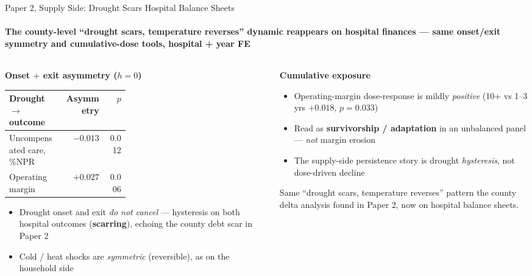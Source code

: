 \documentclass[aspectratio=169,11pt]{beamer}
\newcommand{\emphcolor}[1]{{\color{WarmOrange}\textbf{#1}}}
\newcommand{\tealtext}[1]{{\color{Teal}#1}}
\newcommand{\graytext}[1]{{\color{WarmGray}#1}}
\begin{document}
\begin{frame}{Paper 2, Supply Side: Drought Scars Hospital Balance Sheets}
  \framesubtitle{The county-level ``drought scars, temperature reverses'' dynamic reappears on hospital finances --- same onset/exit symmetry and cumulative-dose tools, hospital + year FE}
  \begin{columns}[T]
    \begin{column}{0.50\textwidth}
      \footnotesize
      \textbf{\tealtext{Onset \(+\) exit asymmetry (\(h=0\))}}
      \vspace{0.2em}
      \scriptsize
      \begin{tabular}{@{}>{\raggedright\arraybackslash}p{0.46\linewidth}rr@{}}
        \toprule
        Drought \(\to\) outcome & Asymmetry & \(p\) \\
        \midrule
        \rowcolor{Teal!10}
        Uncompensated care, \%NPR & \emphcolor{\(-0.013\)} & 0.012 \\
        Operating margin          & \emphcolor{\(+0.027\)} & 0.006 \\
        \bottomrule
      \end{tabular}
      \vspace{0.35em}
      \begin{itemize}\itemsep0.12em
        \item Drought onset and exit \emph{do not cancel} --- hysteresis on both hospital outcomes (\emphcolor{scarring}), echoing the county debt scar in Paper 2
        \item Cold / heat shocks are \emph{symmetric} (reversible), as on the household side
      \end{itemize}
    \end{column}
    \begin{column}{0.46\textwidth}
      \footnotesize
      \textbf{\tealtext{Cumulative exposure}}
      \begin{itemize}\itemsep0.12em
        \item Operating-margin dose-response is mildly \emph{positive} (10+ vs 1--3 yrs \(+0.018\), \(p=0.033\))
        \item Read as \emphcolor{survivorship / adaptation} in an unbalanced panel --- \emph{not} margin erosion
        \item The supply-side persistence story is drought \emph{hysteresis}, not dose-driven decline
      \end{itemize}
      \vspace{0.3em}
      \graytext{\scriptsize Same ``drought scars, temperature reverses'' pattern the county delta analysis found in Paper 2, now on hospital balance sheets.}
    \end{column}
  \end{columns}
\end{frame}
\end{document}
